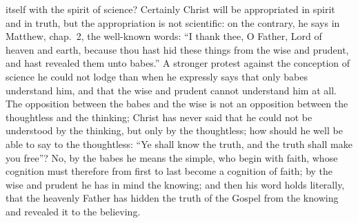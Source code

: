 \documentclass[12pt]{book}
\begin{document}
itself with the spirit of science? Certainly Christ will be appropriated
in spirit and in truth, but the appropriation is not scientific: on the
contrary, he says in Matthew, chap.~2, the well-known words:
``I thank thee, O Father, Lord of heaven and earth, because thou hast
hid these things from the wise and prudent, and hast revealed them unto
babes.''
A stronger protest against the conception of science he could not lodge
than when he expressly says that only babes understand him, and that the
wise and prudent cannot understand him at all. The opposition between
the babes and the wise is not an opposition between the thoughtless and
the thinking; Christ has never said that he could not be understood by
the thinking, but only by the thoughtless; how should he well be able to
say to the thoughtless: ``Ye shall know the truth, and the truth shall
make you free''? No, by the babes he means the simple, who begin with
faith, whose cognition must therefore from first to last become a
cognition of faith; by the wise and prudent he has in mind the knowing;
and then his word holds literally, that the heavenly Father has hidden
the truth of the Gospel from the knowing and revealed it to the
believing.
\end{document}
